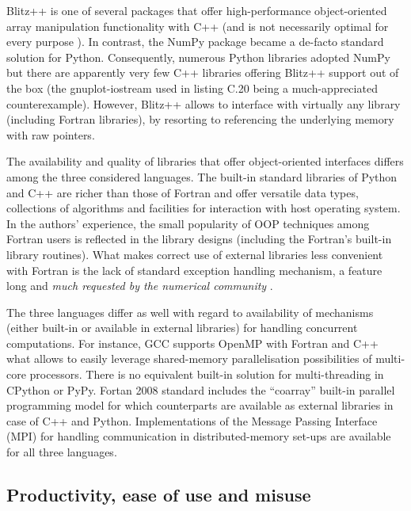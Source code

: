 \documentclass[twocolumn]{article}
\newcommand{\changed}[1]{#1}
\begin{document}
  Blitz++ is one of several packages that offer high-performance object-oriented
    array manipulation functionality with C++ (and is not necessarily optimal for every
    purpose \citep{Iglberger_et_al_2012}).
  In contrast, the NumPy package became a de-facto standard solution for Python.
  Consequently, numerous Python libraries adopted NumPy but
    there are apparently very few C++ libraries offering Blitz++ support out of the box
    (the gnuplot-iostream used in listing C.20 being a much-appreciated counterexample).
  However, Blitz++ allows to interface with virtually any library (including Fortran libraries), 
    by resorting to referencing the underlying memory with raw pointers.
 
  The availability and quality of libraries that offer object-oriented interfaces
    differs among the three considered languages.
  The built-in standard libraries of Python and C++ are richer than
    those of Fortran and offer versatile data types, collections of
    algorithms and facilities for interaction with host operating system.
  In the authors' experience, the small popularity of OOP techniques among
    Fortran users is reflected in the library designs (including the Fortran's
    built-in library routines).
  What makes correct use of external libraries \changed{less convenient} with Fortran 
    is the lack of standard exception handling mechanism, a feature
    long and {\em much requested by the numerical community} \citep[][Foreword]{Press_et_al_1996}.

  \changed{
  The three languages differ as well with regard to availability of 
    mechanisms \changed{(either built-in or available in external libraries)}
    for handling concurrent computations.
  For instance, GCC supports OpenMP with Fortran and C++ what allows to easily
    leverage shared-memory parallelisation possibilities of multi-core processors.
  There is no equivalent built-in solution for multi-threading in
    CPython or PyPy.
  Fortan 2008 standard includes the ``coarray'' built-in parallel programming model for
    which counterparts are available as external libraries in case of C++ and Python.
  Implementations of the Message Passing Interface (MPI) for handling communication 
    in distributed-memory set-ups are available for all three languages.
  } 

  \subsection{\changed{Productivity, ease of use and misuse}}
  
\end{document}
